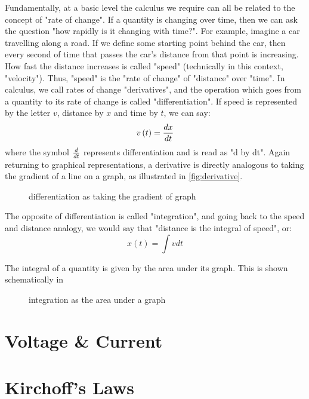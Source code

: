 \documentclass{memoir}
\begin{document}
	Fundamentally, at a basic level the calculus we require can all be related to the concept of "rate of change". If a quantity is changing over time, then we can ask the question "how rapidly is it changing with time?". For example, imagine a car travelling along a road. If we define some starting point behind the car, then every second of time that passes the car's distance from that point is increasing. How fast the distance increases is called "speed" (technically in this context, "velocity"). Thus, "speed" is the "rate of change" of "distance" over "time". In calculus, we call rates of change "derivatives", and the operation which goes from a quantity to its rate of change is called "differentiation". If speed is represented by the letter $v$, distance by $x$ and time by $t$, we can say:
	\begin{equation}
		v\left(t\right) = {d x \over dt}
	\end{equation}
	where the symbol $d \over dt$ represents differentiation and is read as "d by dt". Again returning to graphical representations, a derivative is directly analogous to taking the gradient of a line on a graph, as illustrated in \autoref{fig:derivative}.
	
	\begin{figure}
		\caption{\label{fig:derivative} differentiation as taking the gradient of graph}
	\end{figure}

	The opposite of differentiation is called "integration", and going back to the speed and distance analogy, we would say that "distance is the integral of speed", or:
	\begin{equation}
		x\left(t\right) = \int v dt
	\end{equation}
	
	The integral of a quantity is given by the area under its graph. This is shown schematically in 

	\begin{figure}	
		\caption{\label{fig:integration} integration as the area under a graph}
	\end{figure}

	\section{Voltage \& Current \label{voltage_current}}
	
	\section{Kirchoff's Laws}
	
\end{document}
